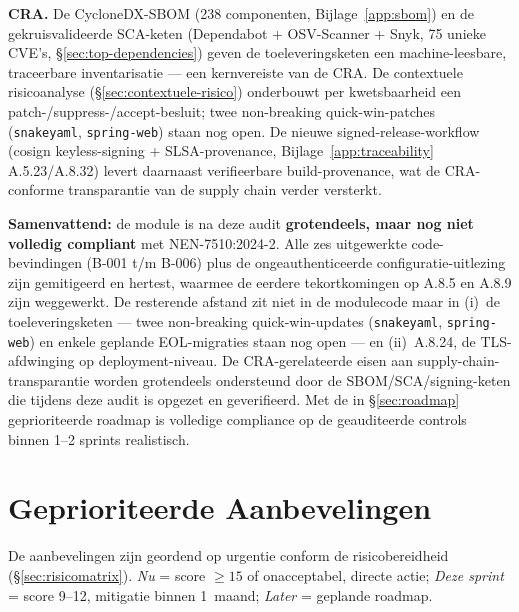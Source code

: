 \documentclass[12pt, a4paper]{report}
\newcommand{\amber}[1]{\textcolor{ragAmber}{\textbf{#1}}}
\begin{document}
\textbf{CRA.} De CycloneDX-SBOM (238 componenten, Bijlage~\ref{app:sbom}) en
de gekruisvalideerde SCA-keten (Dependabot + OSV-Scanner + Snyk, 75 unieke
CVE's, \S\ref{sec:top-dependencies}) geven de toeleveringsketen een
machine-leesbare, traceerbare inventarisatie --- een kernvereiste van de CRA.
De contextuele risicoanalyse (\S\ref{sec:contextuele-risico}) onderbouwt per
kwetsbaarheid een patch-/suppress-/accept-besluit; twee non-breaking
quick-win-patches (\texttt{snakeyaml}, \texttt{spring-web}) staan nog open.
De nieuwe signed-release-workflow (cosign keyless-signing + SLSA-provenance,
Bijlage~\ref{app:traceability} A.5.23/A.8.32) levert daarnaast verifieerbare
build-provenance, wat de CRA-conforme transparantie van de supply chain
verder versterkt.

\textbf{Samenvattend:} de module is na deze audit \amber{grotendeels, maar nog
niet volledig compliant} met NEN-7510:2024-2. Alle zes uitgewerkte
code-bevindingen (B-001 t/m B-006) plus de ongeauthenticeerde
configuratie-uitlezing zijn gemitigeerd en hertest, waarmee de eerdere
tekortkomingen op A.8.5 en A.8.9 zijn weggewerkt. De resterende afstand zit
niet in de modulecode maar in (i)~de toeleveringsketen --- twee
non-breaking quick-win-updates (\texttt{snakeyaml}, \texttt{spring-web}) en
enkele geplande EOL-migraties staan nog open --- en (ii)~A.8.24, de
TLS-afdwinging op deployment-niveau. De CRA-gerelateerde eisen aan
supply-chain-transparantie worden grotendeels ondersteund door de
SBOM/SCA/signing-keten die tijdens deze audit is opgezet en geverifieerd. Met
de in \S\ref{sec:roadmap} geprioriteerde roadmap is volledige compliance op de
geauditeerde controls binnen 1--2 sprints realistisch.

\section{Geprioriteerde Aanbevelingen}
\label{sec:aanbevelingen}

De aanbevelingen zijn geordend op urgentie conform de risicobereidheid
(\S\ref{sec:risicomatrix}). \emph{Nu} = score $\geq 15$ of onacceptabel,
directe actie; \emph{Deze sprint} = score 9--12, mitigatie binnen 1~maand;
\emph{Later} = geplande roadmap.
\end{document}
